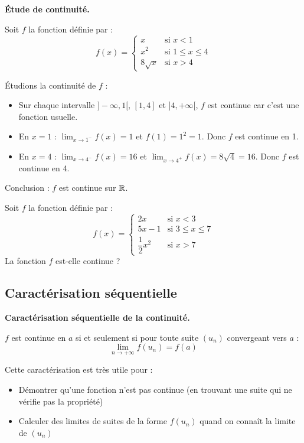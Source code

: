 \documentclass[../PolyS2.tex]{subfiles}
\begin{document}
\begin{Ex}
\textbf{Étude de continuité.}

Soit $f$ la fonction définie par :
$$f(x) = \begin{cases}
    x & \text{si } x < 1 \\
    x^2 & \text{si } 1 \leq x \leq 4 \\
    8\sqrt{x} & \text{si } x > 4
\end{cases}$$

Étudions la continuité de $f$ :
\begin{itemize}
    \item Sur chaque intervalle $]-\infty, 1[$, $[1, 4]$ et $]4, +\infty[$, $f$ est continue car c'est une fonction usuelle.
    \item En $x = 1$ : $\displaystyle\lim_{x \to 1^-} f(x) = 1$ et $f(1) = 1^2 = 1$. Donc $f$ est continue en 1.
    \item En $x = 4$ : $\displaystyle\lim_{x \to 4^-} f(x) = 16$ et $\displaystyle\lim_{x \to 4^+} f(x) = 8\sqrt{4} = 16$. Donc $f$ est continue en 4.
\end{itemize}
Conclusion : $f$ est continue sur $\mathbb{R}$.
\end{Ex}



Soit $f$ la fonction définie par :
$$f(x) = \begin{cases}
    2x & \text{si } x < 3 \\
    5x - 1 & \text{si } 3 \leq x \leq 7 \\
    \dfrac{1}{2}x^2 & \text{si } x > 7
\end{cases}$$
La fonction $f$ est-elle continue ?


\subsection{Caractérisation séquentielle}

\begin{Thm}
\textbf{Caractérisation séquentielle de la continuité.}

$f$ est continue en $a$ si et seulement si pour toute suite $(u_n)$ convergeant vers $a$ :
$$\lim_{n \to +\infty} f(u_n) = f(a)$$
\end{Thm}

\begin{Rmq}
Cette caractérisation est très utile pour :
\begin{itemize}
    \item Démontrer qu'une fonction n'est pas continue (en trouvant une suite qui ne vérifie pas la propriété)
    \item Calculer des limites de suites de la forme $f(u_n)$ quand on connaît la limite de $(u_n)$
\end{itemize}
\end{Rmq}
\end{document}
